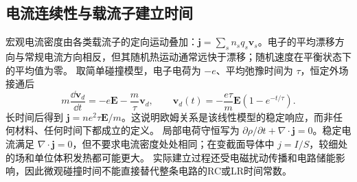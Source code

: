 \subsection{电流连续性与载流子建立时间}
宏观电流密度由各类载流子的定向运动叠加：$\boldsymbol j=\sum_s n_sq_s\boldsymbol v_s$。电子的平均漂移方向与常规电流方向相反，但其随机热运动通常远快于漂移；随机速度在平衡状态下的平均值为零。
取简单碰撞模型，电子电荷为 $-e$、平均弛豫时间为 $\tau$，恒定外场接通后
\[
 m\frac{\dd\boldsymbol v_d}{\dd t}=-e\boldsymbol E-\frac m\tau\boldsymbol v_d,
 \qquad\boldsymbol v_d(t)=-\frac{e\tau}{m}\boldsymbol E(1-e^{-t/\tau}).
\]
长时间后得到 $\boldsymbol j=ne^2\tau\boldsymbol E/m$。这说明欧姆关系是该线性模型的稳定响应，而非任何材料、任何时间下都成立的定义。
局部电荷守恒写为 $\partial\rho/\partial t+\nabla\cdot\boldsymbol j=0$。稳定电流满足 $\nabla\cdot\boldsymbol j=0$，但不要求电流密度处处相同；在变截面导体中 $j=I/S$，较细处的场和单位体积发热都可能更大。
实际建立过程还受电磁扰动传播和电路储能影响，因此微观碰撞时间不能直接替代整条电路的RC或LR时间常数。

